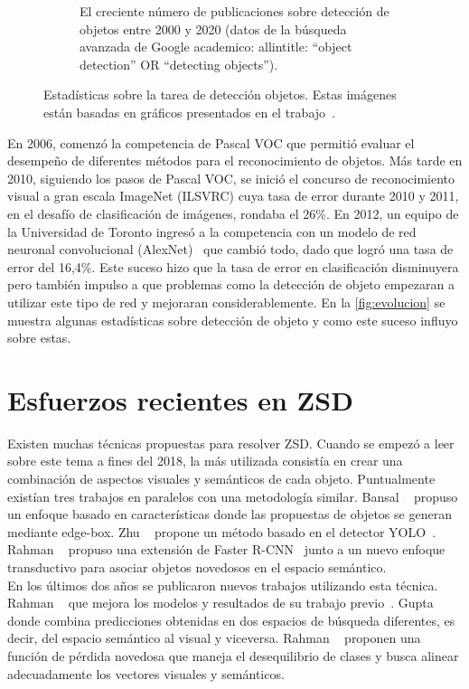\begin{figure}[]
\begin{subfigure}{0.75\textwidth}
		\caption{El creciente número de publicaciones sobre detección de objetos entre 2000 y 2020 (datos de la búsqueda avanzada de Google academico: allintitle: ``object detection'' OR ``detecting objects'').}
		\label{fig:NMS}
	\end{subfigure}
	\caption{Estadísticas sobre la tarea de detección objetos. Estas imágenes están basadas en gráficos presentados en el trabajo~\cite{zou2019object}.}
	\label{fig:evolucion}
\end{figure}

En 2006, comenzó la competencia de Pascal VOC que permitió evaluar el desempeño de diferentes métodos para el reconocimiento de objetos. Más tarde en 2010, siguiendo los pasos de Pascal VOC, se inició el concurso de reconocimiento visual a gran escala ImageNet (ILSVRC) cuya tasa de error durante 2010 y 2011, en el desafío de clasificación de imágenes, rondaba el 26\%.  En 2012, un equipo de la Universidad de Toronto ingresó a la competencia con un modelo de red neuronal convolucional (AlexNet)~\cite{krizhevsky2012imagenet} que cambió todo, dado que logró una tasa de error del 16,4\%. Este suceso hizo que la tasa de error en clasificación disminuyera pero también impulso a que problemas como la detección de objeto empezaran a utilizar este tipo de red y mejoraran considerablemente. En la \autoref{fig:evolucion} se muestra algunas estadísticas sobre detección de objeto y como este suceso influyo sobre estas.


\section{Esfuerzos recientes en ZSD}\label{sec:esfuerzosrecientesenZSD}

Existen muchas técnicas propuestas para resolver ZSD. Cuando se empezó a leer sobre este tema a fines del 2018, la más utilizada consistía en crear una combinación de aspectos visuales y semánticos de cada objeto. Puntualmente existían tres trabajos en paralelos con una metodología similar. Bansal \etal~\cite{bansal2018zero} propuso un enfoque basado en características donde las propuestas de objetos se generan mediante edge-box. Zhu \etal~\cite{zhu2018zero} propone un método basado en el detector YOLO~\cite{redmon2016you}. Rahman \etal~\cite{rahman2018zero} propuso una extensión de Faster R-CNN~\cite{ren2015faster} junto a un nuevo enfoque transductivo para asociar objetos novedosos en el espacio semántico.\\

En los últimos dos años se publicaron nuevos trabajos utilizando esta técnica. Rahman \etal~\cite{rahman2020zero} que mejora los modelos y resultados de su trabajo previo~\cite{rahman2018zero}. Gupta \etal~\cite{gupta2020multi} donde combina predicciones obtenidas en dos espacios de búsqueda diferentes, es decir, del espacio semántico al visual y viceversa. Rahman \etal~\cite{rahman2020improved} proponen  una función de pérdida novedosa que maneja el desequilibrio de clases y busca alinear adecuadamente los vectores visuales y semánticos.


